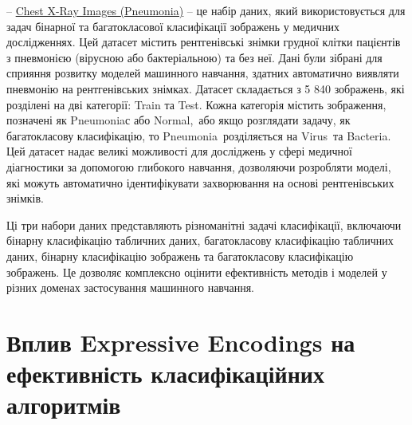 -- \href{https://www.kaggle.com/datasets/paultimothymooney/chest-xray-pneumonia/data}{Chest X-Ray Images (Pneumonia)} -- це набір даних, який використовується для задач бінарної та багатокласової класифікації зображень у медичних дослідженнях. Цей датасет містить рентгенівські знімки грудної клітки пацієнтів з пневмонією (вірусною або бактеріальною) та без неї. Дані були зібрані для сприяння розвитку моделей машинного навчання, здатних автоматично виявляти пневмонію на рентгенівських знімках. Датасет складається з 5 840 зображень, які розділені на дві категорії: Train та Test. Кожна категорія містить зображення, позначені як \glqq Pneumoniaс або \glqq Normal,\grqq\ або якщо розглядати задачу, як багатокласову класифікацію, то \glqq Pneumonia\grqq\ розділяється на \glqq Virus\grqq\ та \glqq Bacteria\grqq. Цей датасет надає великі можливості для досліджень у сфері медичної діагностики за допомогою глибокого навчання, дозволяючи розробляти моделі, які можуть автоматично ідентифікувати захворювання на основі рентгенівських знімків.

Ці три набори даних представляють різноманітні задачі класифікації, включаючи бінарну класифікацію табличних даних, багатокласову класифікацію табличних даних, бінарну класифікацію зображень та багатокласову класифікацію зображень. Це дозволяє комплексно оцінити ефективність методів і моделей у різних доменах застосування машинного навчання.

\section{Вплив Expressive Encodings на ефективність класифікаційних алгоритмів}

